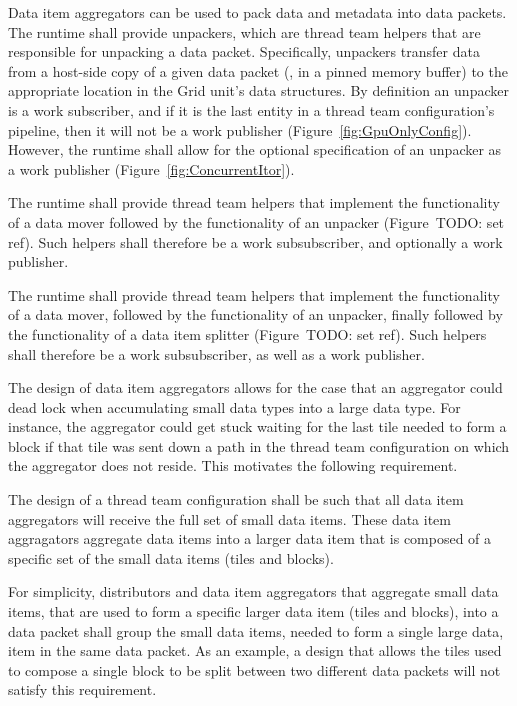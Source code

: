 \documentclass{article}
\begin{document}
\begin{req}
Data item aggregators can be used to pack data and metadata into data packets.
The runtime shall provide unpackers, which are thread team helpers that are
responsible for unpacking a data packet. Specifically, unpackers transfer data
from a host-side copy of a given data packet (\eg, in a pinned memory buffer) to
the appropriate location in the Grid unit's data structures.  By definition an
unpacker is a work subscriber, and if it is the last entity in a thread team
configuration's pipeline, then it will not be a work publisher
(Figure~\ref{fig:GpuOnlyConfig}).  However, the runtime shall allow for the
optional specification of an unpacker as a work publisher
(Figure~\ref{fig:ConcurrentItor}).
\end{req}

\begin{req}
The runtime shall provide thread team helpers that implement the functionality
of a data mover followed by the functionality of an unpacker
(Figure~TODO: set ref). %
Such helpers shall therefore be a work subsubscriber, and
optionally a work publisher.
\end{req}

\begin{req}
The runtime shall provide thread team helpers that implement the functionality
of a data mover, followed by the functionality of an unpacker,
finally followed by the functionality of a data item splitter (Figure~TODO: set ref). %
Such helpers shall therefore be a work subsubscriber, as well as a work
publisher.
\end{req}

The design of data item aggregators allows for the case that an aggregator could
dead lock when accumulating small data types into a large data type.  For
instance, the aggregator could get stuck waiting for the last tile needed to form
a block if that tile was sent down a path in the thread team configuration on
which the aggregator does not reside.  This motivates the following requirement.

\begin{req}
The design of a thread team configuration shall be such that all data item
aggregators will receive the full set of small data items. These data item aggragators
aggregate data items into a larger data item that
is composed of a specific set of the small data items (\eg tiles and blocks).
\end{req}

\begin{req}
For simplicity, distributors and data item aggregators that aggregate small data
 items, that are used to form a specific larger data item
(\eg tiles and blocks), into a
data packet shall group the small data items, needed to form a single
large data, item in the same data packet.  As an example, a design that allows
 the tiles used to compose a
single block to be split between two different data packets
will not satisfy this requirement.
\end{req}
\end{document}
